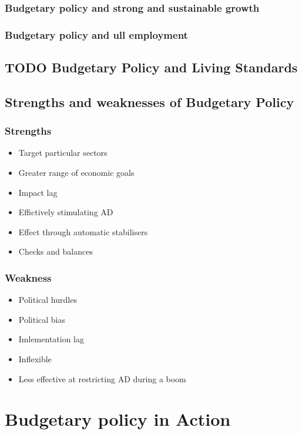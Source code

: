 \documentclass[11pt]{article}
\begin{document}
\subsubsection{Budgetary policy and strong and sustainable growth}
\label{sec-1-10-4}

\subsubsection{Budgetary policy and ull employment}
\label{sec-1-10-5}

\subsection{{\bfseries\sffamily TODO} Budgetary Policy and Living Standards}
\label{sec-1-11}

\subsection{Strengths and weaknesses of Budgetary Policy}
\label{sec-1-12}
\subsubsection{Strengths}
\label{sec-1-12-1}
\begin{itemize}
\item Target particular sectors
\item Greater range of economic goals
\item Impact lag
\item Effictively stimulating AD
\item Effect through automatic stabilisers
\item Checks and balances
\end{itemize}
\subsubsection{Weakness}
\label{sec-1-12-2}
\begin{itemize}
\item Political hurdles
\item Political bias
\item Imlementation lag
\item Inflexible
\item Less effective at restricting AD during a boom
\end{itemize}



\section{Budgetary policy in Action}
\label{sec-2}
\end{document}
